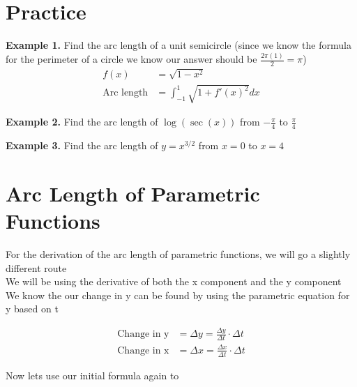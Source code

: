 \documentclass[10pt]{extarticle}
\begin{document}
\section{Practice}
\textbf{Example 1.} Find the arc length of a unit semicircle (since we know the formula for the perimeter of a circle we know our answer should be $\frac{2\pi (1)}{2} = \pi$)
\begin{align}
    f(x) &= \sqrt{1-x^2} \\
    \text{Arc length} &= \int_{-1}^{1} \sqrt{1 + f'(x)^2} dx 
\end{align}

\begin{center}
\end{center}

\vspace{0.5cm}


\textbf{Example 2.} Find the arc length of $\log(\sec(x))$ from $-\frac{\pi}{4}$ to $\frac{\pi}{4}$

\vspace{12cm}

\textbf{Example 3.} Find the arc length of $y = x^{3/2} $ from $x = 0$ to $x= 4$ 

\vspace{8cm}

\section{Arc Length of Parametric Functions}

For the derivation of the arc length of parametric functions, we will go a slightly different route \\
We will be using the derivative of both the x component and the y component \\ We know the our change in y can be found by using the parametric equation for y based on t 

\begin{align} 
    \text{Change in y} &= \Delta y = \frac{\Delta y}{\Delta t} \cdot \Delta t \\
    \text{Change in x} &= \Delta x = \frac{\Delta x}{\Delta t} \cdot \Delta t  
\end{align}

Now lets use our initial formula again to 
\end{document}
